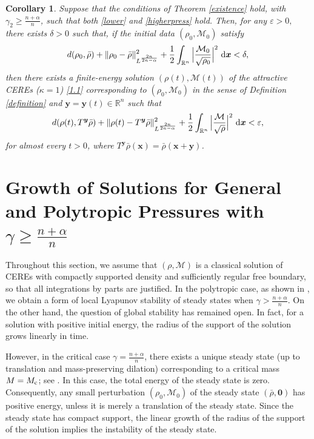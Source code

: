 \documentclass[reqno,11pt]{amsart}
\numberwithin{equation}{section}
\newcommand{\R}{\mathbb{R}}
\newtheorem{corollary}[theorem]{Corollary}
\theoremstyle{definition}
\def\v{\varepsilon}
\def\dd{{\, \rm d}}
\begin{document}
\begin{corollary}
Suppose that the conditions of {\rm Theorem \ref{existence}} hold, 
with $\gamma_2 \geq \frac{n+\alpha}{n}$, such that 
both \eqref{lower} and \eqref{higherpress} hold. 
Then, for any $\v>0,$ there exists $\delta>0$ such that, 
if the initial data $(\rho_0,\mathcal{M}_0)$ satisfy
\begin{align*}
d(\rho_0,\bar{\rho})+ \| \rho_0 - \bar{\rho} \|_{L^\frac{2n}{2n - \alpha}}^2+\frac{1}{2}\int_{\R^n} \Big|\frac{\mathcal{M}_0}{\sqrt{\rho_0}}\Big|^2\,\dd \boldsymbol{x}<\delta,
\end{align*}
then there exists a finite-energy solution $(\rho(t),\mathcal{M}(t))$ of the attractive 
CEREs {\rm (}$\kappa = 1${\rm )} \eqref{1.1} corresponding to $(\rho_0,\mathcal{M}_0)$ in the sense of {\rm Definition \ref{definition}} 
and $\boldsymbol{y}=\boldsymbol{y}(t)\in \R^n$ such that
\begin{align*}
d(\rho(t),T^{\boldsymbol{y}}\bar{\rho})+ \| \rho(t) - T^{\boldsymbol{y}}\bar{\rho} \|_{L^{\frac{2n}{2n - \alpha}}}^2+\frac{1}{2}\int_{\R^n} \Big|\frac{\mathcal{M}}{\sqrt{\rho}}\Big|^2\,\dd\boldsymbol{x}<\v,
\end{align*}
for almost every $t>0$, where $T^{\boldsymbol{y}}\bar{\rho}(\boldsymbol{x})=\bar{\rho}(\boldsymbol{x}+\boldsymbol{y})$.
\end{corollary}

\section{Growth of Solutions for General and Polytropic Pressures with $\gamma \geq \frac{n + \alpha}{n}$}\label{section3}


Throughout this section, we assume that $(\rho,\mathcal{M})$ is a classical solution
of CEREs with compactly supported density
and sufficiently regular free boundary, so that all integrations by parts are justified.
In the polytropic case, as shown in \cite{Carrillo2025}, we obtain a form of
local Lyapunov stability of steady states when $\gamma > \frac{n + \alpha}{n}$.
On the other hand, the question of global stability has remained open.
In fact, for a solution with positive initial energy, the radius of the support of 
the solution grows linearly in time.  


However, in the critical case $\gamma=\frac{n+\alpha}{n}$, 
there exists a unique steady state (up to translation and mass-preserving dilation) 
corresponding to 
a critical mass $M=M_{\rm c}$; see \cite[Theorem 3]{Calvez_2021}. 
In this case, the total energy of the steady state is zero. 
Consequently, any small perturbation $(\rho_0,\mathcal{M}_0)$ of the steady state $(\bar{\rho},\boldsymbol{0})$ has positive energy, unless it is merely a translation 
of the steady state. 
Since the steady state has compact support, 
the linear growth of the radius of the support of the solution implies 
the instability of the steady state. 
\end{document}
